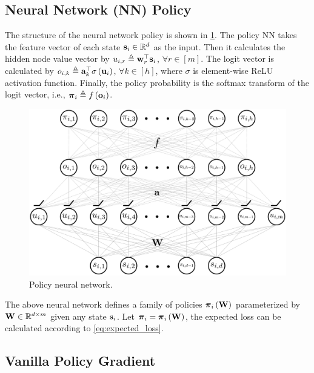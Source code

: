 \subsection{Neural Network (NN) Policy}

The structure of the neural network policy is shown in \cref{fig:nn_policy}. The policy NN takes the feature vector of each state ${\mathbf{s}}_i \in {\mathbb{R}}^d$ as the input. Then it calculates the hidden node value vector by $u_{i,r} \triangleq {\mathbf{w}}_r^\top {\mathbf{s}}_i$, $\forall r \in [m]$. The logit vector is calculated by $o_{i,k} \triangleq {\mathbf{a}}_k^\top \sigma\left( {\mathbf{u}}_i \right)$, $\forall k \in [h]$, where $\sigma$ is element-wise ReLU activation function. Finally, the policy probability is the softmax transform of the logit vector, i.e., ${\boldsymbol{\pi}}_i \triangleq f\left( {\mathbf{o}}_i \right)$.
\begin{figure}[t]
\vskip 0.2in
\begin{center}
\centerline{\includegraphics[width=\columnwidth]{nn_policy.pdf}}
\caption{Policy neural network.}
\label{fig:nn_policy}
\end{center}
\vskip -0.2in
\end{figure}

The above neural network defines a family of policies ${\boldsymbol{\pi}}_i \left( {\mathbf{W}} \right)$ parameterized by ${\mathbf{W}} \in {\mathbb{R}}^{d \times m}$ given any state ${\mathbf{s}}_i$. Let ${\boldsymbol{\pi}}_i = {\boldsymbol{\pi}}_i \left( {\mathbf{W}} \right)$, the expected loss can be calculated according to \cref{eq:expected_loss}.

\subsection{Vanilla Policy Gradient}

